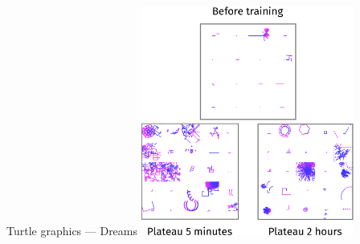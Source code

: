 \documentclass{beamer}
\begin{document}
\begin{frame}{Turtle graphics --- Dreams}
  \centering
  \includegraphics[width=7cm]{figures/dreams/montageTalkDreams.eps}
\end{frame}


\end{document}
